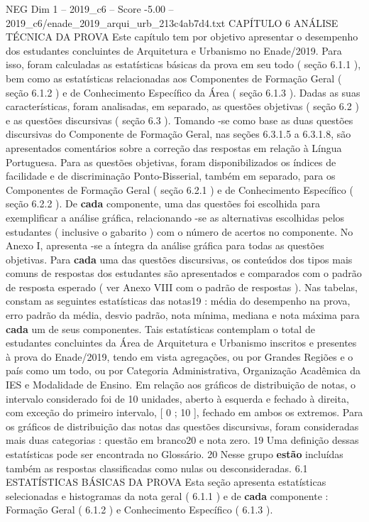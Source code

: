 \begin{textsample}{NEG Dim 1 – 2019\_c6 – Score -5.00 – 2019\_c6/enade\_2019\_arqui\_urb\_213c4ab7d4.txt}  \label{ex:f1_neg_100}
CAPÍTULO 6 ANÁLISE TÉCNICA DA PROVA Este capítulo tem por objetivo apresentar o desempenho dos estudantes concluintes de Arquitetura e Urbanismo no Enade/2019.
Para isso, foram calculadas as estatísticas básicas da prova em seu todo ( seção 6.1.1 ), bem como as estatísticas relacionadas aos Componentes de Formação Geral ( seção 6.1.2 ) e de Conhecimento Específico da Área ( seção 6.1.3 ).
Dadas as suas características, foram analisadas, em separado, as questões objetivas ( seção 6.2 ) e as questões discursivas ( seção 6.3 ).
Tomando -se como base as duas questões discursivas do Componente de Formação Geral, nas seções 6.3.1.5 a 6.3.1.8, são apresentados comentários sobre a correção das respostas em relação à Língua Portuguesa.
Para as questões objetivas, foram disponibilizados os índices de facilidade e de discriminação Ponto-Bisserial, também em separado, para os Componentes de Formação Geral ( seção 6.2.1 ) e de Conhecimento Específico ( seção 6.2.2 ).
De \textbf{cada} componente, uma das questões foi escolhida para exemplificar a análise gráfica, relacionando -se as alternativas escolhidas pelos estudantes ( inclusive o gabarito ) com o número de acertos no componente.
No Anexo I, apresenta -se a íntegra da análise gráfica para todas as questões objetivas.
Para \textbf{cada} uma das questões discursivas, os conteúdos dos tipos mais comuns de respostas dos estudantes são apresentados e comparados com o padrão de resposta esperado ( ver Anexo VIII com o padrão de respostas ).
Nas tabelas, constam as seguintes estatísticas das notas19 : média do desempenho na prova, erro padrão da média, desvio padrão, nota mínima, mediana e nota máxima para \textbf{cada} um de seus componentes.
Tais estatísticas contemplam o total de estudantes concluintes da Área de Arquitetura e Urbanismo inscritos e presentes à prova do Enade/2019, tendo em vista agregações, ou por Grandes Regiões e o país como um todo, ou por Categoria Administrativa, Organização Acadêmica da IES e Modalidade de Ensino.
Em relação aos gráficos de distribuição de notas, o intervalo considerado foi de 10 unidades, aberto à esquerda e fechado à direita, com exceção do primeiro intervalo, [ 0 ; 10 ], fechado em ambos os extremos.
Para os gráficos de distribuição das notas das questões discursivas, foram consideradas mais duas categorias : questão em branco20 e nota zero. 19 Uma definição dessas estatísticas pode ser encontrada no Glossário. 20 Nesse grupo \textbf{estão} incluídas também as respostas classificadas como nulas ou desconsideradas. 6.1 ESTATÍSTICAS BÁSICAS DA PROVA Esta seção apresenta estatísticas selecionadas e histogramas da nota geral ( 6.1.1 ) e de \textbf{cada} componente : Formação Geral ( 6.1.2 ) e Conhecimento Específico ( 6.1.3 ).

\end{textsample}
